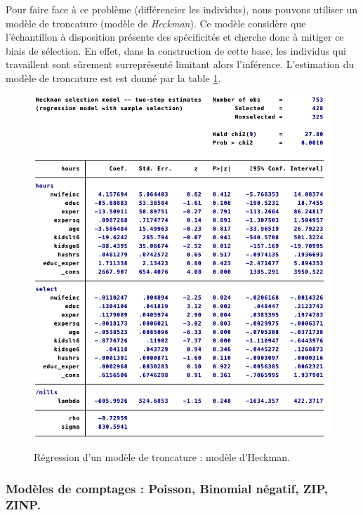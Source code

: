 \vspace*{0.3cm}

Pour faire face à ce problème (différencier les individus), nous pouvons utiliser un modèle de troncature (modèle de \emph{Heckman}). Ce modèle considère que l’échantillon à disposition présente des spécificités et cherche donc à mitiger ce biais de sélection. En effet, dans la construction de cette base, les individus qui travaillent sont sûrement surreprésenté limitant alors l'inférence. L'estimation du modèle de troncature est est donné par la table \ref{reg:HeckmanModel}.

\begin{figure}[!h]
    \caption{Régression d'un modèle de troncature : modèle d'Heckman.}
    \includegraphics[scale = 0.8]{100_tab_results/Heckman.png}
    \centering
    \label{reg:HeckmanModel}
\end{figure}

\newpage

\subsubsection{Modèles de comptages : Poisson, Binomial négatif, ZIP, ZINP.}

